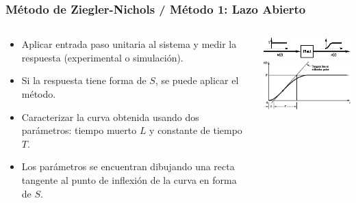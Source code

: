 \documentclass[aspectratio=169,handout]{beamer}
\theoremstyle{definition}
\theoremstyle{plain}
\theoremstyle{remark}
\begin{document}
\begin{frame}[<+->]\frametitle{Método de Ziegler-Nichols / Método 1: Lazo Abierto}
\small
\vspace*{-2mm}
\begin{columns}
\begin{column}{0.5\textwidth}
\begin{itemize}
	\item Aplicar entrada paso unitaria al sistema y medir la respuesta (experimental o simulación).
	\item Si la respuesta tiene forma de $S$, se puede aplicar el método.
	\item Caracterizar la curva obtenida usando dos parámetros: tiempo muerto $L$ y constante de tiempo $T$.
	\item Los parámetros se encuentran dibujando una recta tangente al punto de inflexión de la curva en forma de $S$.
\end{itemize}
\end{column}	
\begin{column}{0.5\textwidth}
\includegraphics[width=6.5cm]{images/zieglerNichols1a.eps}\\
\vspace*{5mm}
\includegraphics[width=6.5cm]{images/zieglerNichols1b.eps}
\end{column}	
\end{columns}
\end{frame}
\end{document}
